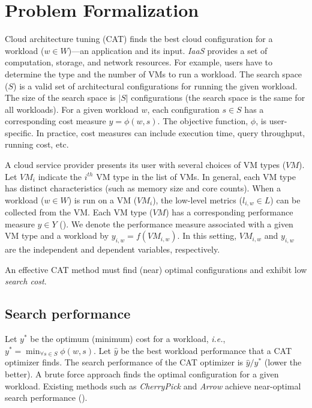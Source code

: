 \section{Problem Formalization}

Cloud architecture tuning (CAT) finds the best cloud configuration
for a workload ($w\in W$)---an application and its input.
\emph{IaaS} provides a set of computation, storage, and network resources.
For example, users have to determine the type and the number of VMs
to run a workload.
The search space ($S$) is a valid set of
architectural configurations for running the given workload.
The size of the search space is $|S|$ configurations
(the search space is the same for all workloads).
For a given workload $w$,
each configuration $s \in S$ has a corresponding cost measure $y=\phi(w, s)$.
The objective function, $\phi$, is user-specific.
In practice, cost measures can include
execution time, query throughput, running cost, etc. 

A cloud service provider presents its user with several choices of VM types ($\mathit{VM}$).
Let $\mathit{VM}_i$ indicate the $i^{th}$ VM type in the list of VMs.
In general, each VM type has distinct characteristics (such as memory size and core counts).
When a workload ($w\in W$) is run on a VM ($\mathit{VM}_i$), the low-level metrics ($l_{i,w}\in L$) can be collected from the VM.
Each VM type ($\mathit{VM}$) has a corresponding performance measure $y\in Y$ ().
We denote the performance measure associated with a given VM type and a workload by $y_{i,w}=f(\mathit{VM}_{i,w})$.
In this setting, $\mathit{VM}_{i,w}$ and $y_{i,w}$ are the independent and dependent variables, respectively.

An effective CAT method must
find (near) optimal configurations and
exhibit low \emph{search cost}.

\subsection*{Search performance}
Let $y^{*}$ be the optimum (minimum) cost for a workload, 
\emph{i.e.},
$y^* = \min_{\forall s \in S} \phi(w, s)$.
Let $\hat{y}$ be the best workload performance that a CAT optimizer finds.
The search performance of the CAT optimizer is $\hat{y}/y^{*}$
(lower the better).
A brute force approach finds the optimal configuration for a given workload.
Existing methods such as \emph{CherryPick} and \emph{Arrow} achieve
near-optimal search performance ().

